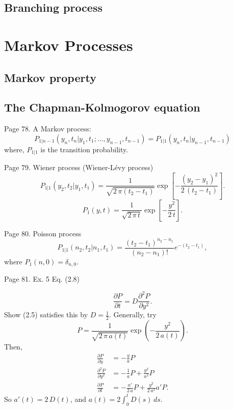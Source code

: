 \documentclass{book}
\numberwithin{equation}{section}
\theoremstyle{plain}
\theoremstyle{definition}
\theoremstyle{remark}
\theoremstyle{BoldStyle}
\numberwithin{exercise}{section}
\begin{document}
\section{Branching process}


\chapter{Markov Processes}


\section{Markov property}

\section{The Chapman-Kolmogorov equation}

Page 78.
A Markov process:
$$
P_{1|n-1}(y_n, t_n| y_1, t_1; \dots, y_{n-1}, t_{n-1})
=
P_{1|1}(y_n, t_n|y_{n-1},t_{n-1})
$$
where, $P_{1|1}$ is the transition probability.

Page 79.
Wiener process (Wiener-L\'evy process)
\begin{equation}
P_{1|1}(y_2, t_2|y_1, t_1)
=
\frac{1}{\sqrt{2\,\pi(t_2 - t_1)}}
\exp\left[
  -\frac{ (y_2 - y_1)^2 } { 2 \, (t_2 - t_1) }
\right].
\tag{2.4}
\end{equation}
%
\begin{equation}
P_1(y, t)
=
\frac{1}{\sqrt{2\,\pi\,t}}
\exp\left[
  -\frac{ y^2 } { 2 \, t }
\right].
\tag{2.5}
\end{equation}


Page 80.
Poisson process
\begin{equation}
P_{1|1}(n_2, t_2|n_1, t_1)
=
\frac{ (t_2 - t_1)^{n_2 - n_1} } { (n_2 - n_1)! }
e^{ -(t_2 - t_1) },
\tag{2.6}
\end{equation}
where
$P_1(n, 0) = \delta_{n,0}$.

Page 81. Ex. 5 Eq. (2.8)

$$
\frac{ \partial P } { \partial t }
=
D \frac{ \partial^2 P } { \partial y^2 }.
$$
Show (2.5) satisfies this by $D = \frac{1}{2}$.
Generally, try
$$
P = \frac{ 1 } { \sqrt{ 2 \, \pi \, a(t) } }
\exp\left(
  - \frac{ y^2 } { 2 \, a(t) }
\right).
$$
Then,
$$
\begin{aligned}
\frac{ \partial P } { \partial y }
&=
- \frac{ y } { a } P
\\
\frac{ \partial^2 P } { \partial y^2 }
&=
- \frac{1}{a} P
+ \frac{ y^2 } { a^2 } P
\\
\frac{ \partial P } { \partial t }
&=
-\frac{ a' } { 2 \, a } P
+ \frac{ y^2 } { 2 \, a^2 } a' P.
\end{aligned}
$$
So $a'(t) = 2 \, D(t)$,
and
$a(t) = 2 \int^t_0 D(s) \, ds$.
\end{document}
